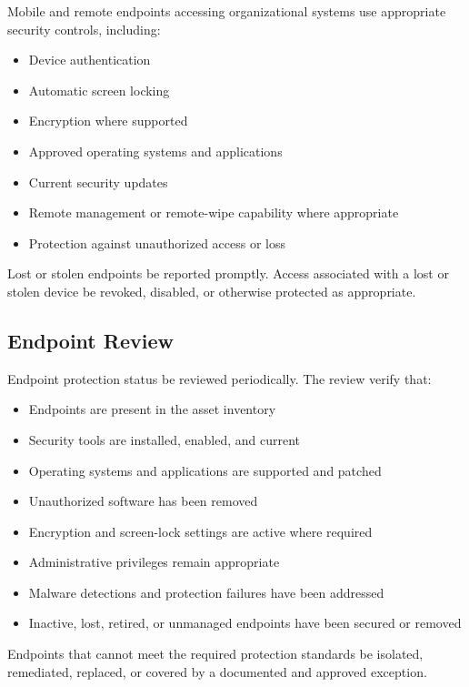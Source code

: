 Mobile and remote endpoints accessing organizational systems \must{} use appropriate security controls, including:
\begin{itemize}
    \item Device authentication
    \item Automatic screen locking
    \item Encryption where supported
    \item Approved operating systems and applications
    \item Current security updates
    \item Remote management or remote-wipe capability where appropriate
    \item Protection against unauthorized access or loss
\end{itemize}

Lost or stolen endpoints \must{} be reported promptly. Access associated with a lost or stolen device \must{} be revoked, disabled, or otherwise protected as appropriate.

\subsection{Endpoint Review}

Endpoint protection status \must{} be reviewed periodically. The review \should{} verify that:
\begin{itemize}
    \item Endpoints are present in the asset inventory
    \item Security tools are installed, enabled, and current
    \item Operating systems and applications are supported and patched
    \item Unauthorized software has been removed
    \item Encryption and screen-lock settings are active where required
    \item Administrative privileges remain appropriate
    \item Malware detections and protection failures have been addressed
    \item Inactive, lost, retired, or unmanaged endpoints have been secured or removed
\end{itemize}

Endpoints that cannot meet the required protection standards \must{} be isolated, remediated, replaced, or covered by a documented and approved exception.